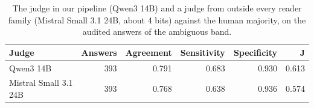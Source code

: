 \begin{table}[t]
\centering\small
\setlength{\tabcolsep}{4pt}
\caption{The judge in our pipeline (Qwen3 14B) and a judge from outside every reader family (Mistral Small 3.1 24B, about 4 bits) against the human majority, on the audited answers of the ambiguous band.}
\label{tab:rev2_judges}
\begin{tabular*}{\linewidth}{@{\extracolsep{\fill}}lrrrrr}
\toprule
Judge & Answers & Agreement & Sensitivity & Specificity & J \\
\midrule
Qwen3 14B & 393 & 0.791 & 0.683 & 0.930 & 0.613 \\
Mistral Small 3.1 24B & 393 & 0.768 & 0.638 & 0.936 & 0.574 \\
\bottomrule
\end{tabular*}
\end{table}
